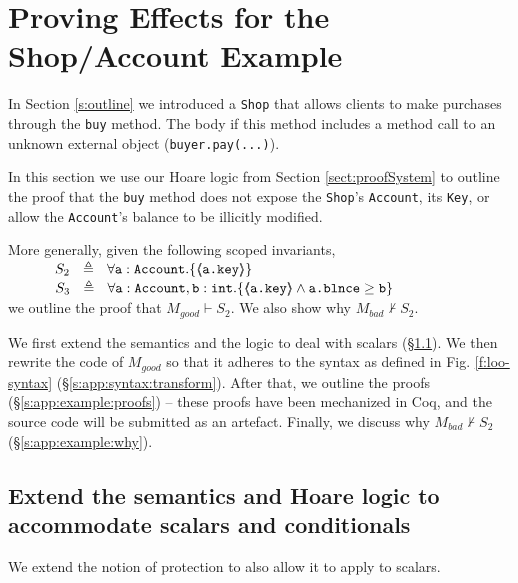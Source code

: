 \newcommand{\SPT}{~ \strut \hspace{.9cm}}

\section{  {Proving \Tamed Effects for the Shop/Account Example}}

\label{s:app:example}

In Section \ref{s:outline} we introduced a \verb|Shop| that allows clients to make purchases through the
\verb|buy| method.
The body if this method  includes a method call to an unknown external object (\verb|buyer.pay(...)|).

In this section  we use our Hoare logic from Section \ref{sect:proofSystem} to {outline the proof} that the \verb|buy| method
does not expose the \verb|Shop|'s  \verb|Account|, its \verb|Key|, or allow the \verb|Account|'s balance to be illicitly modified. 

More generally,   given  the following scoped invariants, \\  
$\strut  \SPSP  S_2\ \  \triangleq \ \ \TwoStatesN  {\prg{a}:\prg{Account}}  {\inside{\prg{a.key}}} $ 
 \\
$\strut  \SPSP  S_3\ \  \triangleq \ \ \TwoStatesN{ \prg{a}:\prg{Account},\prg{b}:\prg{int} } {\inside{\prg{a.key}} \wedge \prg{a.\balance} \geq \prg{b} } $ 
\\
 we {outline the proof} that $M_{good} \vdash S_2$.
{We  also show why $M_{bad} \not\vdash S_2$.}

{We first extend the semantics and the logic to deal with scalars (\S \ref{s:app:scalars}). 
We then rewrite the code of $M_{good}$ so that it adheres to the syntax as defined in Fig. \ref{f:loo-syntax} (\S \ref{s:app:syntax:transform}). 
After that, we outline the proofs (\S \ref{s:app:example:proofs}) --
these proofs have been mechanized in Coq, and the source code will be
submitted as an artefact. %
Finally, we discuss why $M_{bad} \not\vdash S_2$ (\S \ref{s:app:example:why}).}


\subsection{Extend the semantics and Hoare logic to accommodate scalars and conditionals}
\label{s:app:scalars}

{We extend the notion of protection to also allow it to apply to scalars. }


